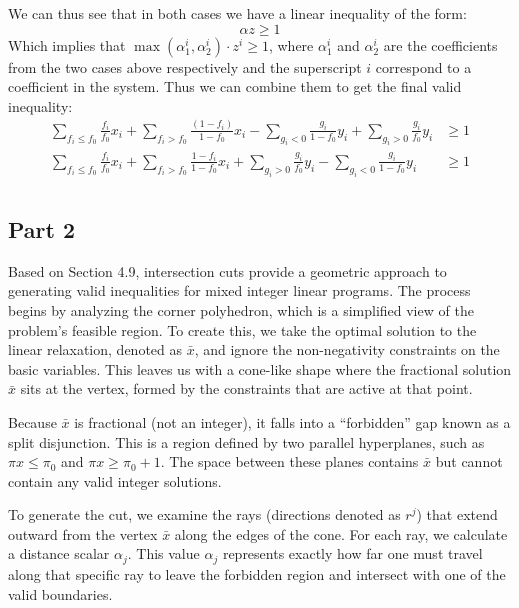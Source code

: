 \documentclass{article}
\begin{document}
    We can thus see that in both cases we have a linear inequality of the form:
    \[
        \alpha z \geq 1
    \]
    Which implies that $\max(\alpha_1^i, \alpha_2^i) \cdot z^i \geq 1$, where $\alpha_1^i$ and $\alpha_2^i$ are the coefficients from the two cases above respectively and the superscript $i$ correspond to a coefficient in the system. 
    Thus we can combine them to get the final valid inequality:
    \begin{align*}
        \sum_{f_i\leq f_0} \frac{f_i}{f_0} x_i + \sum_{f_i > f_0} \frac{\left(1-f_i\right)}{1-f_0} x_i - \sum_{g_i<0}\frac{g_i}{1-f_0} y_i + \sum_{g_i>0}\frac{g_i}{f_0} y_i &\geq 1\\
        \sum_{f_i\leq f_0} \frac{f_i}{f_0} x_i + \sum_{f_i > f_0} \frac{1-f_i}{1-f_0} x_i + \sum_{g_i>0}\frac{g_i}{f_0} y_i - \sum_{g_i<0}\frac{g_i}{1-f_0} y_i &\geq 1\\
    \end{align*}

    \subsection*{Part 2}
    Based on Section 4.9, intersection cuts provide a geometric approach to generating valid inequalities for mixed integer linear programs. 
    The process begins by analyzing the corner polyhedron, which is a simplified view of the problem's feasible region. 
    To create this, we take the optimal solution to the linear relaxation, denoted as $\bar{x}$, and ignore the non-negativity constraints on the basic variables. 
    This leaves us with a cone-like shape where the fractional solution $\bar{x}$ sits at the vertex, formed by the constraints that are active at that point.

    Because $\bar{x}$ is fractional (not an integer), it falls into a ``forbidden'' gap known as a split disjunction. 
    This is a region defined by two parallel hyperplanes, such as $\pi x \le \pi_0$ and $\pi x \ge \pi_0 + 1$. 
    The space between these planes contains $\bar{x}$ but cannot contain any valid integer solutions.

    To generate the cut, we examine the rays (directions denoted as $r^j$) that extend outward from the vertex $\bar{x}$ along the edges of the cone. 
    For each ray, we calculate a distance scalar $\alpha_j$. This value $\alpha_j$ represents exactly how far one must travel along that specific ray to leave the forbidden region and intersect with one of the valid boundaries.
\end{document}
